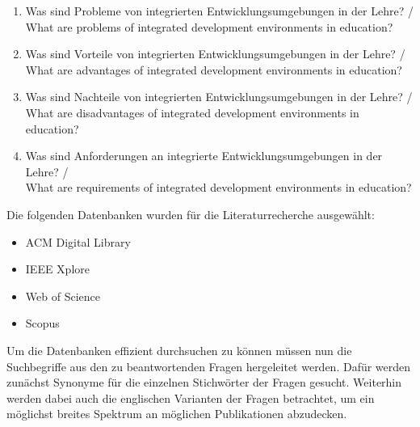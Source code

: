 \begin{enumerate}
    \item Was sind Probleme von integrierten Entwicklungsumgebungen in der Lehre? /\\
          What are problems of integrated development environments in education?
    \item Was sind Vorteile von integrierten Entwicklungsumgebungen in der Lehre? /\\
          What are advantages of integrated development environments in education?
    \item Was sind Nachteile von integrierten Entwicklungsumgebungen in der Lehre? /\\
          What are disadvantages of integrated development environments in education?
    \item Was sind Anforderungen an integrierte Entwicklungsumgebungen in der Lehre? /\\
          What are requirements of integrated development environments in education?
\end{enumerate}

Die folgenden Datenbanken wurden für die Literaturrecherche ausgewählt:

\begin{itemize}
    \item ACM Digital Library
    \item IEEE Xplore
    \item Web of Science
    \item Scopus
\end{itemize}

Um die Datenbanken effizient durchsuchen zu können müssen nun die Suchbegriffe aus den zu beantwortenden Fragen hergeleitet werden. Dafür werden zunächst Synonyme für die einzelnen Stichwörter der Fragen gesucht. Weiterhin werden dabei auch die englischen Varianten der Fragen betrachtet, um ein möglichst breites Spektrum an möglichen Publikationen abzudecken.

